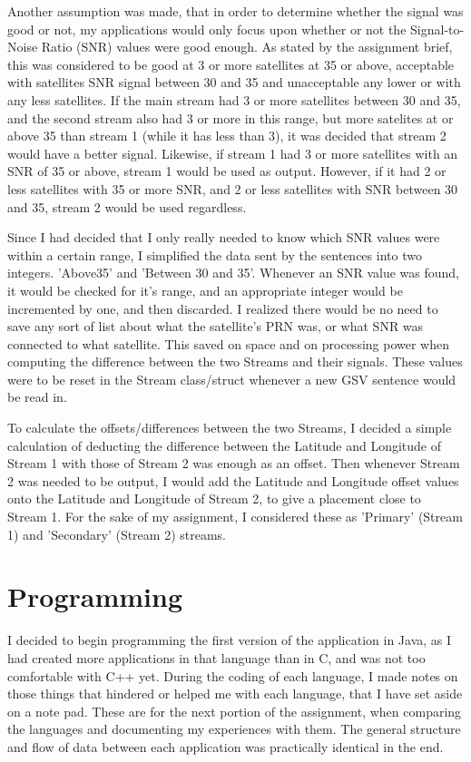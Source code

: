 \documentclass{article}
\begin{document}
Another assumption was made, that in order to determine whether the signal was good or not, my applications would only focus upon whether or not the Signal-to-Noise Ratio (SNR) values were good enough. As stated by the assignment brief, this was considered to be good at 3 or more satellites at 35 or above, acceptable with satellites SNR signal between 30 and 35 and unacceptable any lower or with any less satellites. If the main stream had 3 or more satellites between 30 and 35, and the second stream also had 3 or more in this range, but more satelites at or above 35 than stream 1 (while it has less than 3), it was decided that stream 2 would have a better signal. Likewise, if stream 1 had 3 or more satellites with an SNR of 35 or above, stream 1 would be used as output. However, if it had 2 or less satellites with 35 or more SNR, and 2 or less satellites with SNR between 30 and 35, stream 2 would be used regardless.

Since I had decided that I only really needed to know which SNR values were within a certain range, I simplified the data sent by the sentences into two integers. 'Above35' and 'Between 30 and 35'. Whenever an SNR value was found, it would be checked for it's range, and an appropriate integer would be incremented by one, and then discarded. I realized there would be no need to save any sort of list about what the satellite's PRN was, or what SNR was connected to what satellite. This saved on space and on processing power when computing the difference between the two Streams and their signals. These values were to be reset in the Stream class/struct whenever a new GSV sentence would be read in.

To calculate the offsets/differences between the two Streams, I decided a simple calculation of deducting the difference between the Latitude and Longitude of Stream 1 with those of Stream 2 was enough as an offset. Then whenever Stream 2 was needed to be output, I would add the Latitude and Longitude offset values onto the Latitude and Longitude of Stream 2, to give a placement close to Stream 1. For the sake of my assignment, I considered these as 'Primary' (Stream 1) and 'Secondary' (Stream 2) streams.

\section{Programming}

I decided to begin programming the first version of the application in Java, as I had created more applications in that language than in C, and was not too comfortable with C++ yet. During the coding of each language, I made notes on those things that hindered or helped me with each language, that I have set aside on a note pad. These are for the next portion of the assignment, when comparing the languages and documenting my experiences with them. The general structure and flow of data between each application was practically identical in the end.
\end{document}
